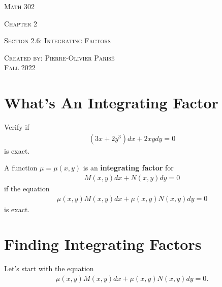 \documentclass[12pt,a4paper]{article}
\newcounter{example}[section]
\begin{document}
\thispagestyle{empty}

\begin{center}
\vspace*{2.5cm}

{\Huge \textsc{Math 302}}

\vspace*{2cm}

{\LARGE \textsc{Chapter 2}} 

\vspace*{0.75cm}

\noindent\textsc{Section 2.6: Integrating Factors}

\vspace*{0.75cm}

\tableofcontents

\vfill

\noindent \textsc{Created by: Pierre-Olivier Paris{\'e}} \\
\textsc{Fall 2022}
\end{center}

\newpage

\section{What's An Integrating Factor}

\begin{example}
Verify if 
	\begin{align*}
	(3x + 2y^3) dx + 2xy dy = 0
	\end{align*}
is exact.
\end{example}

\vfill

A function $\mu = \mu (x ,y)$ is an \textbf{integrating factor} for
	\begin{align*}
	M (x, y) dx + N (x, y) dy = 0
	\end{align*}
if the equation
	\begin{align*}
	\mu (x, y) M (x, y) dx + \mu (x, y) N (x ,y) dy = 0 
	\end{align*}
is exact.

\newpage

\section{Finding Integrating Factors}

Let's start with the equation
	\begin{align}
	\mu (x, y) M (x, y) dx + \mu (x, y) N (x, y) dy = 0 . \label{Eq:ExactForm}
	\end{align}
	
\end{document}
